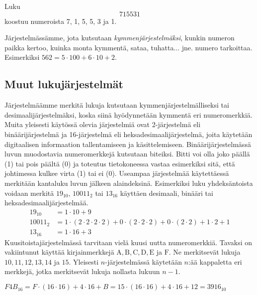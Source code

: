 \begin{esimerkki}
Luku \[715531\] koostuu numeroista 7, 1, 5, 5, 3 ja 1.
\end{esimerkki}

Järjestelmässämme, jota kutsutaan \emph{kymmenjärjestelmäksi}, kunkin numeron paikka kertoo, kuinka monta kymmentä, sataa, tuhatta... jne. numero tarkoittaa. Esimerkiksi $562 = 5 \cdot 100 + 6 \cdot 10 + 2$.


\subsection*{Muut lukujärjestelmät}

Järjestelmäämme merkitä lukuja kutsutaan kymmenjärjestelmälliseksi tai desimaalijärjestelmäksi, koska siinä hyödynnetään kymmentä eri numeromerkkiä. Muita yleisesti käytössä olevia järjestelmiä ovat 2-järjestelmä eli binäärijärjestelmä ja 16-järjestelmä eli heksadesimaalijärjestelmä, joita käytetään digitaalisen informaation tallentamiseen ja käsittelemiseen. Binäärijärjestelmässä luvun muodostavia numeromerkkejä kutsutaan biteiksi. Bitti voi olla joko päällä (1) tai pois päältä (0) ja toteutus tietokoneessa vastaa esimerkiksi sitä, että johtimessa kulkee virta (1) tai ei (0). Useampaa järjestelmää käytettäessä merkitään kantaluku luvun jälkeen alaindeksinä. Esimerkiksi luku yhdeksäntoista voidaan merkitä $19_{10}$, $10011_{2}$ tai $13_{16}$ käyttäen desimaali, binääri tai heksadesimaalijärjestelmää.
\begin{align}
19_{10} &= 1 \cdot 10 + 9 \\
10011_{2} &= 1 \cdot (2 \cdot 2 \cdot 2 \cdot 2) + 0 \cdot (2 \cdot 2 \cdot 2) + 0 \cdot (2 \cdot 2) + 1 \cdot 2 + 1 \\
13_{16} &= 1 \cdot 16 + 3
\end{align}
Kuusitoistajärjestelmässä tarvitaan vielä kuusi uutta numeromerkkiä. Tavaksi on vakiintunut käyttää kirjainmerkkejä $\mathrm{A, B, C, D, E}$ ja $\mathrm{F}$. Ne merkitsevät lukuja $10, 11, 12, 13, 14$ ja $15$. Yleisesti $n$-järjestelmässä käytetään $n$:ää kappaletta eri merkkejä, jotka merkitsevät lukuja nollasta lukuun $n-1$.
\begin{esimerkki}
$F4B_{16} = F \cdot (16 \cdot 16) + 4 \cdot 16 + B = 15 \cdot (16 \cdot 16) + 4 \cdot 16 + 12 = 3916_{10}$
\end{esimerkki}

